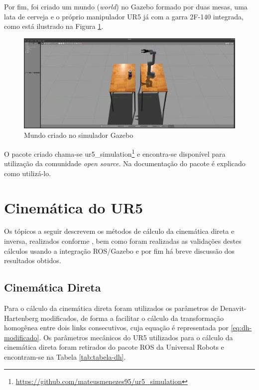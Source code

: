 Por fim, foi criado um mundo (\textit{world}) no Gazebo formado por duas mesas, uma lata de
cerveja e o próprio manipulador UR5 já com a garra 2F-140 integrada, como está ilustrado na
Figura \ref{fig:gazebo-world}.

\begin{figure}[h]
	\centering
	\caption{Mundo criado no simulador Gazebo}
	\label{fig:gazebo-world}
	\includegraphics[width=\textwidth]{images/gazebo_world.png}
\end{figure}

O pacote criado chama-se ur5\_simulation\footnote{\url{https://github.com/mateusmenezes95/ur5_simulation}}
e encontra-se disponível para utilização da comunidade \textit{open source}. Na documentação do
pacote é explicado como utilizá-lo.

\section{Cinemática do UR5}

Os tópicos a seguir descrevem os métodos de cálculo da cinemática direta e inversa, realizados conforme \cite{Andersen2018}, 
bem como foram realizadas as validações destes cálculos usando a integração ROS/Gazebo e por fim há breve discussão dos resultados obtidos. 

\subsection{Cinemática Direta}
\label{ssec:cinematica-direta}

Para o cálculo da cinemática direta foram utilizados os parâmetros de Denavit-Hartenberg modificados,
de forma a facilitar o cálculo da transformação homogênea entre dois links consecutivos, cuja equação
é representada por \ref{eq:dh-modificado}. Os parâmetros mecânicos do UR5 utilizados para o cálculo da 
cinemática direta foram retirados do pacote ROS da Universal Robots e encontram-se na Tabela \ref{tab:tabela-dh}.

